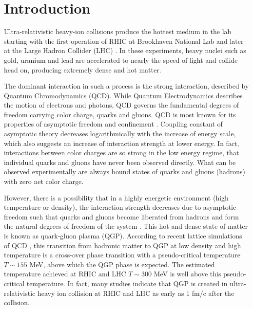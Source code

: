 \documentclass[aps,prl,twocolumn,groupedaddress]{revtex4-1}
\begin{document}
\pacs{}

\maketitle

\section{Introduction}
	Ultra-relativistic heavy-ion collisions produce the hottest medium in the lab starting with the first operation of RHIC \citep{Arsene:2004fa, Adams:2005dq} at Brookhaven National Lab and later at the Large Hadron Collider (LHC) \citep{Aamodt:2010pa}. 
	In these experiments, heavy nuclei such as gold, uranium and lead are accelerated to nearly the speed of light and collide head on, producing extremely dense and hot matter.
	 
	The dominant interaction in such a process is the strong interaction, described by Quantum Chromodynamics (QCD).
	While Quantum Electrodynamics describes the motion of electrons and photons, QCD governs the fundamental degrees of freedom carrying color charge, quarks and gluons.	
	QCD is most known for its properties of asymptotic freedom and confinement \citep{Gross:1973id, Politzer:1973fx}. 
	Coupling constant of asymptotic theory decreases logarithmically with the increase of energy scale, which also suggests an increase of interaction strength at lower energy.
	In fact, interactions between color charges are so strong in the low energy regime, that individual quarks and gluons have never been observed directly.
	What can be observed experimentally are always bound states of quarks and gluons (hadrons) with zero net color charge.

	However, there is a possibility that in a highly energetic environment (high temperature or density), the interaction strength decreases due to asymptotic freedom such that quarks and gluons become liberated from hadrons and form the natural degrees of freedom of the system \citep{Collins:1974ky}. 
	This hot and dense state of matter is known as quark-gluon plasma (QGP). 
	According to recent lattice simulations of QCD \cite{Bhattacharya:2014ara}, this transition from hadronic matter to QGP at low density and high temperature is a cross-over phase transition with a pseudo-critical temperature $T \sim 155$ MeV, above which the QGP phase is expected.
	The estimated temperature achieved at RHIC and LHC $T \sim 300$ MeV \citep{Adare:2009qk, Adam:2015lda} is well above this pseudo-critical temperature.	
	In fact, many studies \cite{Muller:2006ee} indicate that QGP is created in ultra-relativistic heavy ion collision at RHIC and LHC as early as $1$ fm/c after the collision.
	
\end{document}
